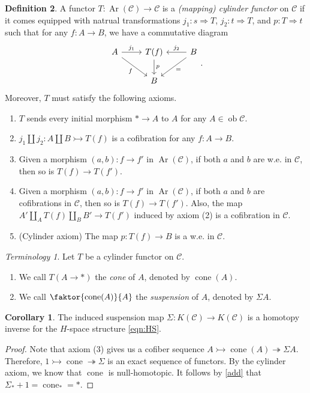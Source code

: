 \documentclass[10pt,letterpaper,cm]{nupset}
\theoremstyle{definition}
\newtheorem{definition}{Definition}[section]
\theoremstyle{theorem}
\newtheorem{corollary}[definition]{Corollary}
\theoremstyle{remark}
\newtheorem*{term}{Terminology}
\newcommand{\1}{\mathbf{1}}
\renewcommand{\c}{\mathscr{C}}
\newcommand{\0}{\vec 0}
\DeclareMathOperator{\ob}{ob}
\DeclareMathOperator{\Ar}{Ar}
\DeclareMathOperator{\cone}{cone}
\begin{document}
\begin{definition}
A functor $T: \Ar(\c) \to \c$ is a \textit{(mapping) cylinder functor} on $\c$ if it comes equipped with natrual transformations $j_1 :  s \Rightarrow T$, $j_2 : t \Rightarrow T$, and $p: T \Rightarrow t$ such that for any $f: A \to B$, we have a commutative diagram
\[
\begin{tikzcd}
A \arrow[r, "j_1"] \arrow[rd, "f"'] & T(f) \arrow[d, "p"] & B \arrow[l, "j_2"'] \arrow[ld, "="] \\
 & B & 
\end{tikzcd}
. \]
Moreover, $T$ must satisfy the following axioms.
\begin{enumerate}[label=(\arabic*)]
\item $T$ sends every initial morphism $\ast \to A$ to $A$ for any $A \in \ob \c$.
\item $j_1 \coprod j_2 : A \coprod B \rightarrowtail T(f)$ is a cofibration for any $f: A \to B$.
\item Given a morphism $(a,b) : f \to f'$ in $\Ar(\c)$, if both $a$ and $b$ are w.e. in $\c$, then so is $T(f) \to T(f').$
\item Given a morphism $(a,b) : f \to f'$ in $\Ar(\c)$, if both $a$ and $b$ are cofibrations in $\c$, then so is $T(f) \to T(f')$. Also, the map $A' \coprod_A T(f) \coprod_B B' \to T(f')$ induced by axiom (2) is a cofibration in $\c$.
\item {(Cylinder axiom)} The map $p: T(f) \to B$ is a w.e. in $\c$.
\end{enumerate}

\smallskip

\begin{term} Let $T$ be a cylinder functor on $\c$.
\begin{enumerate}
\item We call $T(A \to \ast)$ the \textit{cone} of $A$, denoted by $\cone(A)$.
\item We call $\faktor{\cone(A)}{A}$ the \textit{suspension} of $A$, denoted by $\Sigma A$. 
\end{enumerate}
\end{term}

\begin{corollary}
The induced suspension map $\Sigma : K(\c) \to K(\c)$ is a homotopy inverse for the $H$-space structure \eqref{eqn:HS}.
\end{corollary}
\begin{proof}
Note that axiom (3) gives us a cofiber sequence $A \rightarrowtail \cone(A) \twoheadrightarrow \Sigma A$. Therefore, $1 \rightarrowtail \cone \twoheadrightarrow \Sigma$ is an exact sequence of functors. By the cylinder axiom, we know that $\cone$ is null-homotopic. It follows by \cref{add} that $\Sigma_{\ast} + 1 =  \cone_{\ast} = \ast$.
\end{proof}
\end{definition}
\end{document}
